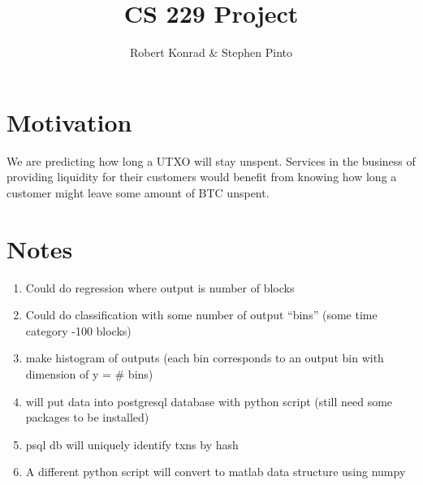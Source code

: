\documentclass[12pt]{article}
\title{CS 229 Project}
\author{Robert Konrad \& Stephen Pinto}
\begin{document}
\maketitle

\section*{Motivation} %
\label{sec:motivation}
We are predicting how long a UTXO will stay unspent. Services in the business of providing liquidity for their customers would benefit from knowing how long a customer might leave some amount of BTC unspent.


\section*{Notes} %
\label{sec:notes}


\begin{enumerate}
\item Could do regression where output is number of blocks
\item Could do classification with some number of output ``bins'' (some time category -100 blocks)
\item make histogram of outputs (each bin corresponds to an output bin with dimension of y = \# bins)
\item will put data into postgresql database with python script (still need some packages to be installed)
\item psql db will uniquely identify txns by hash
\item A different python script will convert to matlab data structure using numpy
\end{enumerate}

\newpage

\end{document}
